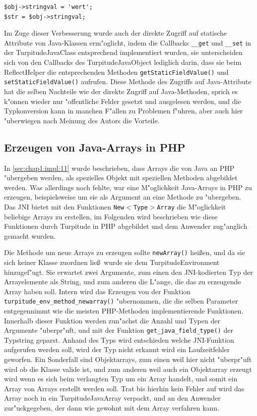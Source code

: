 \begin{lstlisting}[caption=Verbesserter Zugriff auf Java-Attribute]
$obj->stringval = 'wert';
$str = $obj->stringval;
\end{lstlisting}

Im Zuge dieser Verbesserung wurde auch der direkte Zugriff auf statische Attribute von Java-Klassen erm"oglicht, indem die
Callbacks \texttt{\_\_get} und \texttt{\_\_set} in der TurpitudeJavaClass entsprechend implementiert wurden, sie unterscheiden sich
von den Callbacks des TurpitudeJavaObject lediglich darin, dass sie beim ReflectHelper die entsprechenden Methoden
\texttt{getStaticFieldValue()} und \texttt{setStaticFieldValue()} aufrufen.
Diese Methode des Zugriffs auf Java-Attribute hat die selben Nachteile wie der direkte Zugriff auf Java-Methoden, sprich es k"onnen
wieder nur "offentliche Felder gesetzt und ausgelesen werden, und die Typkonversion kann in manchen F"allen zu Problemen f"uhren, aber
auch hier "uberwiegen nach Meinung des Autors die Vorteile.

\subsection{Erzeugen von Java-Arrays in PHP}
\label{sec:chap1:impl:13}

In \ref{sec:chap1:impl:11} wurde beschrieben, dass Arrays die von Java an PHP "ubergeben werden, als spezielles Objekt
mit speziellen Methoden abgebildet werden. Was allerdings noch fehlte, war eine M"oglichkeit Java-Arrays in PHP zu erzeugen,
beispielsweise um sie als Argument an eine Methode zu "ubergeben. Das JNI bietet mit den Funktionen \texttt{New$<$Type$>$Array}
die M"oglichkeit beliebige Arrays zu erstellen, im Folgenden wird beschrieben wie diese Funktionen durch Turpitude in PHP
abgebildet und dem Anwender zug"anglich gemacht wurden.

Die Methode um neue Arrays zu erzeugen sollte \texttt{newArray()} hei\ss en, und da sie sich keiner Klasse zuordnen lie\ss\ wurde 
sie dem TurpitudeEnvironment hinzugef"ugt. Sie erwartet zwei Argumente, zum einen den JNI-kodierten Typ der Arrayelemente 
als String, und zum anderen die L"ange, die das zu erzeugende Array haben soll. Intern wird das Erzeugen von der Funktion
\texttt{turpitude\_env\_method\_newarray()} "ubernommen, die die selben Parameter entgegennimmt wie die meisten PHP-Methoden
implementierende Funktionen. Innerhalb dieser Funktion werden zun"achst die Anzahl und Typen der Argumente "uberpr"uft, und 
mit der Funktion \texttt{get\_java\_field\_type()} der Typstring geparst. Anhand des Typs wird entschieden welche JNI-Funktion
aufgerufen werden soll, wird der Typ nicht erkannt wird ein Laufzeitfehler geworfen. Ein Sonderfall sind Objektarrays, zum einen
weil hier nicht "uberpr"uft wird ob die Klasse valide ist, und zum anderen weil auch ein Objektarray erzeugt wird wenn es sich beim
verlangten Typ um ein Array handelt, und somit ein Array von Arrays erstellt werden soll. Trat bis hierhin kein Fehler auf
wird das Array noch in ein TurpitudeJavaArray verpackt, und an den Anwender zur"uckgegeben, der dann wie gewohnt mit dem Array
verfahren kann.


